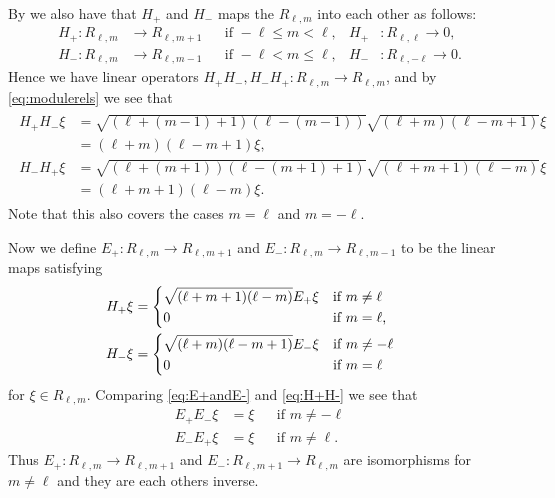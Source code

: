 By  we also have that $H_+$ and $H_-$ maps the $R_{\ell,m}$ into each other as follows:
\begin{align*}
  H_+\colon R_{\ell,m} &\to R_{\ell,m+1} && \mbox{if }-\ell\leq m<\ell, & H_+&\colon R_{\ell,\ell} \to 0, \\
  H_-\colon R_{\ell,m} &\to R_{\ell,m-1} && \mbox{if }-\ell< m\leq \ell, & H_-&\colon R_{\ell,-\ell} \to 0.
\end{align*}
Hence we have linear operators $H_+H_-,H_-H_+\colon R_{\ell,m}\to R_{\ell,m}$, and by \cref{eq:modulerels} we see that
\begin{align}
  \begin{split} \label{eq:H+H-}
    H_+H_-\xi &= \sqrt{(\ell+(m-1)+1)(\ell-(m-1))}\sqrt{(\ell+m)(\ell-m+1)} \xi \\
    &= (\ell+m)(\ell-m+1)\xi, \\
    H_-H_+\xi &= \sqrt{(\ell+(m+1))(\ell-(m+1)+1)}\sqrt{(\ell+m+1)(\ell-m)} \xi \\
    &= (\ell+m+1)(\ell-m)\xi.
  \end{split}
\end{align}
Note that this also covers the cases $m=\ell$ and $m=-\ell$. 

Now we define $E_+ \colon R_{\ell,m}\to R_{\ell,m+1}$ and $E_- \colon R_{\ell,m}\to R_{\ell,m-1}$ to be the linear maps satisfying
\begin{align}
  \begin{split} \label{eq:E+andE-}
    H_+ \xi &=
    \begin{dcases*}
      \sqrt{(\ell+m+1)(\ell-m)}E_+\xi & if $m\neq \ell$ \\
      0 & if $m=\ell$,
    \end{dcases*} \\
    H_- \xi &=
    \begin{dcases*}
      \sqrt{(\ell+m)(\ell-m+1)}E_-\xi & if $m\neq -\ell$ \\
      0 & if $m=\ell$
    \end{dcases*}
  \end{split}
\end{align}
for $\xi\in R_{\ell,m}$. Comparing \cref{eq:E+andE-} and \cref{eq:H+H-} we see that
\begin{align*}
  E_+E_-\xi &= \xi && \mbox{if }m\neq-\ell \\
  E_-E_+\xi &= \xi && \mbox{if }m\neq\ell.
\end{align*}
Thus $E_+\colon R_{\ell,m}\to R_{\ell,m+1}$ and $E_-\colon R_{\ell,m+1}\to R_{\ell,m}$ are isomorphisms for $m\neq\ell$ and they are each others inverse. 

